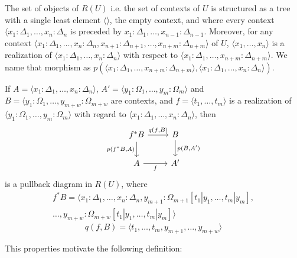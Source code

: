 The set of objects of $R(U)$ i.e. the set of contexts of $U$
is structured as a tree with a single least element $\langle \rangle$,
the empty context, and where every context $\langle x_1 : \Delta_1, \dots, x_n : \Delta_n$
is preceded by $x_1 : \Delta_1, \dots, x_{n-1} : \Delta_{n-1}$.
Moreover, for any context $\langle x_1 : \Delta_1, \dots, x_n : \Delta_n, x_{n+1} : \Delta_{n+1}, \dots, x_{n+m} : \Delta_{n+m} \rangle$
of $U$, $\langle x_1, \dots, x_n \rangle$ is a realization of
$\langle x_1 : \Delta_1, \dots, x_n : \Delta_n \rangle$
with respect to $\langle x_1 : \Delta_1, \dots, x_{n+m} : \Delta_{n+m} \rangle$.
We name that morphism as $p(\langle x_1 : \Delta_1, \dots, x_{n+m} : \Delta_{n+m}\rangle, \langle x_1 : \Delta_1, \dots, x_n : \Delta_n \rangle )$.

\begin{lemma}
    If $A = \langle x_1 : \Delta_1, \dots, x_n : \Delta_n \rangle$,
    $A' = \langle y_1 : \Omega_1, \dots, y_m : \Omega_m \rangle$ and
    $B = \langle y_1 : \Omega_1, \dots, y_{m+w} : \Omega_{m+w}$ 
    are contexts, and $f = \langle t_1, \dots, t_m \rangle$
    is a realization of $\langle y_1 : \Omega_1, \dots, y_m : \Omega_m \rangle$
    with regard to $\langle x_1 : \Delta_1, \dots, x_n : \Delta_n \rangle$,
    then 
    \[
    \begin{tikzcd}
        f^*B \arrow[r, "q(f {,} B)"] \arrow[d, "p(f^*B {,} A)"'] & B \arrow[d, "p(B {,} A')"] \\
        A \arrow[r, "f"'] & A'
    \end{tikzcd}
    \]
    is a pullback diagram in $R(U)$, where
    \begin{multline*}
    f^*B = \langle x_1 : \Delta_1, \dots, x_n : \Delta_n, y_{m+1} : \Omega_{m+1}[t_1 | y_1, \dots, t_m | y_m], \\
    \dots, y_{m+w} : \Omega_{m+w}[t_1 | y_1, \dots, t_m | y_m] \rangle    
    \end{multline*}
    \begin{equation*}
        q(f, B) = \langle t_1, \dots, t_m, y_{m+1}, \dots, y_{m+w} \rangle
    \end{equation*}
\end{lemma}

This properties motivate the following definition:

